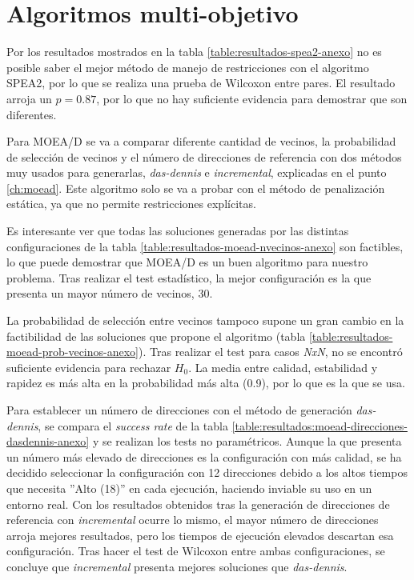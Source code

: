 \section{Algoritmos multi-objetivo}
\label{ch:algoritmos-multiobjetivo}

Por los resultados mostrados en la tabla \ref{table:resultados-spea2-anexo} no es posible saber el mejor método de manejo de restricciones con el algoritmo SPEA2, por lo que se realiza una prueba de Wilcoxon entre pares. El resultado arroja un \textit{$p = 0.87$}, por lo que no hay suficiente evidencia para demostrar que son diferentes.

Para MOEA/D se va a comparar diferente cantidad de vecinos, la probabilidad de selección de vecinos y el número de direcciones de referencia con dos métodos muy usados para generarlas, \textit{das-dennis} e \textit{incremental}, explicadas en el punto \ref{ch:moead}. Este algoritmo solo se va a probar con el método de penalización estática, ya que no permite restricciones explícitas.

Es interesante ver que todas las soluciones generadas por las distintas configuraciones de la tabla \ref{table:resultados-moead-nvecinos-anexo} son factibles, lo que puede demostrar que MOEA/D es un buen algoritmo para nuestro problema. Tras realizar el test estadístico, la mejor configuración es la que presenta un mayor número de vecinos, 30.

La probabilidad de selección entre vecinos tampoco supone un gran cambio en la factibilidad de las soluciones que propone el algoritmo (tabla \ref{table:resultados-moead-prob-vecinos-anexo}). Tras realizar el test para casos \textit{NxN}, no se encontró suficiente evidencia para rechazar \(H_0\). La media entre calidad, estabilidad y rapidez es más alta en la probabilidad más alta (0.9), por lo que es la que se usa.

Para establecer un número de direcciones con el método de generación \textit{das-dennis}, se compara el \textit{success rate} de la tabla \ref{table:resultados:moead-direcciones-dasdennis-anexo} y se realizan los tests no paramétricos. Aunque la que presenta un número más elevado de direcciones es la configuración con más calidad, se ha decidido seleccionar la configuración con 12 direcciones debido a los altos tiempos que necesita ''Alto (18)'' en cada ejecución, haciendo inviable su uso en un entorno real. Con los resultados obtenidos tras la generación de direcciones de referencia con \textit{incremental} ocurre lo mismo, el mayor número de direcciones arroja mejores resultados, pero los tiempos de ejecución elevados descartan esa configuración. Tras hacer el test de Wilcoxon entre ambas configuraciones, se concluye que \textit{incremental} presenta mejores soluciones que \textit{das-dennis}.

